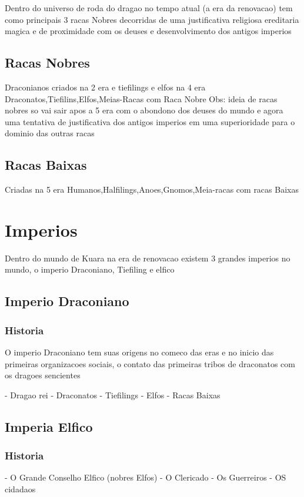 \documentclass{book}
\begin{document}
Dentro do universo de roda do dragao no tempo atual (a era da renovacao) tem como principais 3 
racas Nobres decorridas de uma justificativa religiosa ereditaria magica e de proximidade com os 
deuses e desenvolvimento dos antigos imperios
\section{Racas Nobres}
Draconianos criados na 2 era e tiefilings e elfos na 4 era 
Draconatos,Tiefilins,Elfos,Meias-Racas com Raca Nobre
Obs: ideia de racas nobres so vai sair apos a 5 era com o abondono dos deuses do mundo e agora 
uma tentativa de justificativa dos antigos imperios em uma superioridade para o dominio das 
outras racas 

\section{Racas Baixas}
Criadas na 5 era 
Humanos,Halfilings,Anoes,Gnomos,Meia-racas com racas Baixas

\chapter{Imperios}
Dentro do mundo de Kuara na era de renovacao existem 3 grandes imperios no mundo, o imperio 
Draconiano, Tiefiling e elfico 

\section{Imperio Draconiano}

\subsection*{Historia}
O imperio Draconiano tem suas origens no comeco das eras e no inicio das primeiras organizacoes 
sociais, o contato das primeiras tribos de draconatos com os dragoes sencientes 

- Dragao rei
- Draconatos
- Tiefilings
- Elfos 
- Racas Baixas

\section{Imperia Elfico}
\subsection*{Historia}
- O Grande Conselho Elfico (nobres Elfos)
- O Clericado 
- Os Guerreiros 
- OS cidadaos
\end{document}
